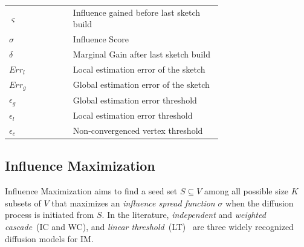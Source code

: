 \documentclass[10pt,journal,compsoc]{IEEEtran}
\begin{document}
\begin{table}[!ht]
\begin{tabular}{|l|p{0.7\linewidth}|}
        $\varsigma $    & Influence gained before last sketch build\\
        $\sigma $       & Influence Score\\
        $\delta$        & Marginal Gain after last sketch build\\
        $Err_l$         & Local estimation error of the sketch\\
        $Err_g$         & Global estimation error of the sketch\\
        $\epsilon_{g}$    & Global estimation error threshold\\
        $\epsilon_{l}$    & Local estimation error threshold\\ 
        $\epsilon_{c}$    & Non-convergenced vertex threshold\\
        \hline         
    \end{tabular}
\end{table}
\subsection{Influence Maximization}

Influence Maximization aims to find a seed set $S \subseteq V$ among all possible size $K$ subsets of $V$ that maximizes an {\em influence spread function} $\sigma$  when the diffusion process is initiated from $S$. %
In the literature, {\em independent} and {\em weighted cascade}~(IC and WC), and 
{\em linear threshold}~(LT)~\cite{kempe2003maximizing} are three widely recognized diffusion models for IM. 
\end{document}
